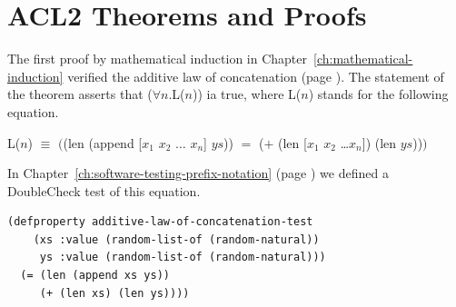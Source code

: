 \section{ACL2 Theorems and Proofs}
\label{sec:theorems-and-acl2-proofs}

The first proof by mathematical induction
in Chapter~\ref{ch:mathematical-induction}
verified the additive law of concatenation
(page \pageref{additive-law-concatenation}).
The statement of the theorem asserts that ($\forall$$n$.L($n$)) ia true,
where L($n$) stands for the following equation.
\label{eq:Ln-additive-law}
\begin{center}
L($n$) $\equiv$ $($\textsf{(len (append [$x_1$ $x_2$ $\dots$ $x_n$] $ys$))} $=$
\textsf{($+$ (len [$x_1$ $x_2$ \dots $x_n$]) (len $ys$))}$)$
\end{center}

In Chapter~\ref{ch:software-testing-prefix-notation} (page \pageref{additive-lengths-test})
we defined a DoubleCheck test of this equation.

\begin{Verbatim}
(defproperty additive-law-of-concatenation-test
    (xs :value (random-list-of (random-natural))
     ys :value (random-list-of (random-natural)))
  (= (len (append xs ys))
     (+ (len xs) (len ys))))
\end{Verbatim}

